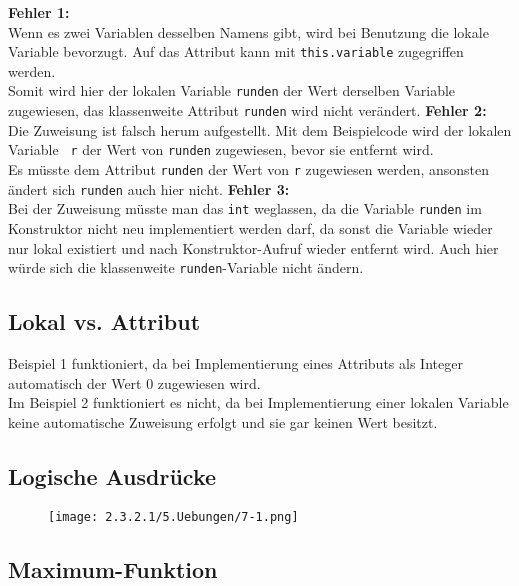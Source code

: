 \documentclass{scrartcl}   %
\begin{document}
\begin{itemize}
    \barrow \textbf{Fehler 1:}\\
    Wenn es zwei Variablen desselben Namens gibt, wird bei Benutzung die lokale Variable bevorzugt. Auf das Attribut kann mit \texttt{this.variable} zugegriffen werden.\\
    Somit wird hier der lokalen Variable \texttt{runden} der Wert derselben Variable zugewiesen, das klassenweite Attribut \texttt{runden} wird nicht verändert.
    \barrow \textbf{Fehler 2:}\\
    Die Zuweisung ist falsch herum aufgestellt. Mit dem Beispielcode wird der lokalen Variable \texttt{ r} der Wert von \texttt{runden} zugewiesen, bevor sie entfernt wird.\\
    Es müsste dem Attribut \texttt{runden} der Wert von \texttt{r} zugewiesen werden, ansonsten ändert sich \texttt{runden} auch hier nicht.
    \barrow \textbf{Fehler 3:}\\
    Bei der Zuweisung müsste man das \texttt{int} weglassen, da die Variable \texttt{runden} im Konstruktor nicht neu implementiert werden darf, da sonst die Variable wieder nur lokal existiert und nach Konstruktor-Aufruf wieder entfernt wird. Auch hier würde sich die klassenweite \texttt{runden}-Variable nicht ändern.
\end{itemize}

\subsection{Lokal vs. Attribut}

Beispiel 1 funktioniert, da bei Implementierung eines Attributs als Integer automatisch der Wert 0 zugewiesen wird.\\
Im Beispiel 2 funktioniert es nicht, da bei Implementierung einer lokalen Variable keine automatische Zuweisung erfolgt und sie gar keinen Wert besitzt.

\newpage

\subsection{Logische Ausdrücke}

\begin{figure}[ht]
	\centering
	\texttt{[image: 2.3.2.1/5.Uebungen/7-1.png]}
\end{figure}

\subsection{Maximum-Funktion}
\end{document}
